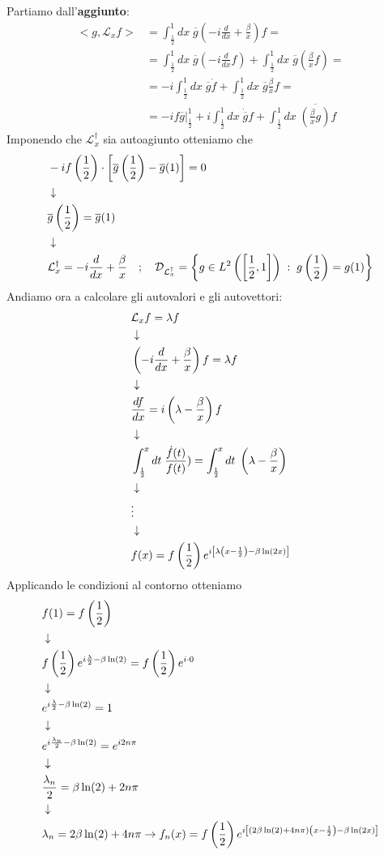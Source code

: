 Partiamo dall'\textbf{aggiunto}:
\begin{align}
	<g,\mathcal{L}_x f> &= \int_{\frac{1}{2}}^{1} dx \; \overline{g} \left(-i \frac{d}{dx} + \frac{\beta}{x}\right) f = \nonumber\\
	&= \int_{\frac{1}{2}}^{1} dx \; \overline{g} \left(-i \frac{d}{dx}f\right) + \int_{\frac{1}{2}}^{1} dx \; \overline{g}\left(\frac{\beta}{x} f\right) = \nonumber\\
	&=-i \int_{\frac{1}{2}}^{1} dx \; \overline{g} \dot{f} + \int_{\frac{1}{2}}^{1} dx \; \overline{g}\frac{\beta}{x}f = \nonumber\\
	&= \left. -i f \overline{g} \right|_{\frac{1}{2}}^{1} +i \int_{\frac{1}{2}}^{1} dx \;  \dot{\overline{g}}f + \int_{\frac{1}{2}}^{1} dx \; \overline{\left(\frac{\beta}{x} g\right)} f
\end{align}
Imponendo che $\mathcal{L}_x^\dagger$ sia autoagiunto otteniamo che
\begin{align}
	&-i f\left( \frac{1}{2} \right) \cdot\left[ \overline{g}\left(\frac{1}{2}\right) - \overline{g}(1) \right] = 0 \\ &\downarrow \nonumber \\
	&\overline{g}\left(\frac{1}{2}\right) = \overline{g}(1) \nonumber \\ &\downarrow \nonumber \\
	&\mathcal{L}_x^\dagger = -i \frac{d}{dx} + \frac{\beta}{x} \quad ; \quad \mathcal{D}_{\mathcal{L}_x^\dagger} = \left\{ g \in L^2 \left( \left[\frac{1}{2},1\right] \right) \; : \; g\left(\frac{1}{2}\right) = g(1) \right\}
\end{align}
Andiamo ora a calcolare gli autovalori e gli autovettori:
\begin{align}
	&\mathcal{L}_x f= \lambda f \\ &\downarrow \nonumber \\
	&\left( -i \frac{d}{dx} + \frac{\beta}{x} \right) f = \lambda f\nonumber \\ &\downarrow \nonumber \\
	&\frac{df}{dx} = i\left( \lambda - \frac{\beta}{x} \right) f \nonumber \\ &\downarrow \nonumber \\
	&\int_{\frac{1}{2}}^{x} dt \; \frac{\dot{f}(t)}{f(t)} ) = \int_{\frac{1}{2}}^{x} dt \; \left( \lambda - \frac{\beta}{x} \right) \nonumber \\ &\downarrow \nonumber \\
	&\vdots\nonumber \\ &\downarrow \nonumber \\
	&f(x) = f\left(\frac{1}{2}\right) e^{i\left[ \lambda \left( x - \frac{1}{2} \right)  - \beta \ln(2x)\right]}
\end{align}
Applicando le condizioni al contorno otteniamo
\begin{align}
	&f(1) =  f\left(\frac{1}{2}\right) \\ &\downarrow \nonumber \\
	&f\left(\frac{1}{2}\right) e^{i\frac{\lambda}{2}  - \beta \ln(2)} = f\left(\frac{1}{2}\right) e^{i\cdot 0}\nonumber \\ &\downarrow \nonumber \\
	&e^{i\frac{\lambda}{2}  - \beta \ln(2)} = 1 \nonumber \\ &\downarrow \nonumber \\
	&e^{i\frac{\lambda_n}{2}  - \beta \ln(2)} = e^{i2n\pi} \nonumber \\ &\downarrow \nonumber \\
	&\frac{\lambda_n}{2}  = \beta \ln(2) + 2n\pi \nonumber \\ &\downarrow \nonumber \\
	&\lambda_n = 2\beta \ln(2) + 4n\pi \to f_n(x) = f\left(\frac{1}{2}\right) e^{i\left[ (2\beta \ln(2) + 4n\pi) \left( x - \frac{1}{2} \right) - \beta \ln(2x)\right]}
\end{align}

